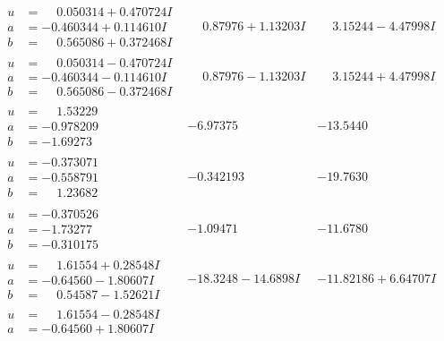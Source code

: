 \documentclass[1p]{elsarticle_modified}
\theoremstyle{definition}
\begin{document}
$$\begin{array}{c|c|c}
\begin{aligned}
u &= \phantom{-}0.050314 + 0.470724 I \\
a &= -0.460344 + 0.114610 I \\
b &= \phantom{-}0.565086 + 0.372468 I\end{aligned}
 & \phantom{-}0.87976 + 1.13203 I & \phantom{-}3.15244 - 4.47998 I \\ \hline\begin{aligned}
u &= \phantom{-}0.050314 - 0.470724 I \\
a &= -0.460344 - 0.114610 I \\
b &= \phantom{-}0.565086 - 0.372468 I\end{aligned}
 & \phantom{-}0.87976 - 1.13203 I & \phantom{-}3.15244 + 4.47998 I \\ \hline\begin{aligned}
u &= \phantom{-}1.53229\phantom{ +0.000000I} \\
a &= -0.978209\phantom{ +0.000000I} \\
b &= -1.69273\phantom{ +0.000000I}\end{aligned}
 & -6.97375\phantom{ +0.000000I} & -13.5440\phantom{ +0.000000I} \\ \hline\begin{aligned}
u &= -0.373071\phantom{ +0.000000I} \\
a &= -0.558791\phantom{ +0.000000I} \\
b &= \phantom{-}1.23682\phantom{ +0.000000I}\end{aligned}
 & -0.342193\phantom{ +0.000000I} & -19.7630\phantom{ +0.000000I} \\ \hline\begin{aligned}
u &= -0.370526\phantom{ +0.000000I} \\
a &= -1.73277\phantom{ +0.000000I} \\
b &= -0.310175\phantom{ +0.000000I}\end{aligned}
 & -1.09471\phantom{ +0.000000I} & -11.6780\phantom{ +0.000000I} \\ \hline\begin{aligned}
u &= \phantom{-}1.61554 + 0.28548 I \\
a &= -0.64560 - 1.80607 I \\
b &= \phantom{-}0.54587 - 1.52621 I\end{aligned}
 & -18.3248 - 14.6898 I & -11.82186 + 6.64707 I \\ \hline\begin{aligned}
u &= \phantom{-}1.61554 - 0.28548 I \\
a &= -0.64560 + 1.80607 I \\

\end{aligned}
\end{array}$$
\end{document}
